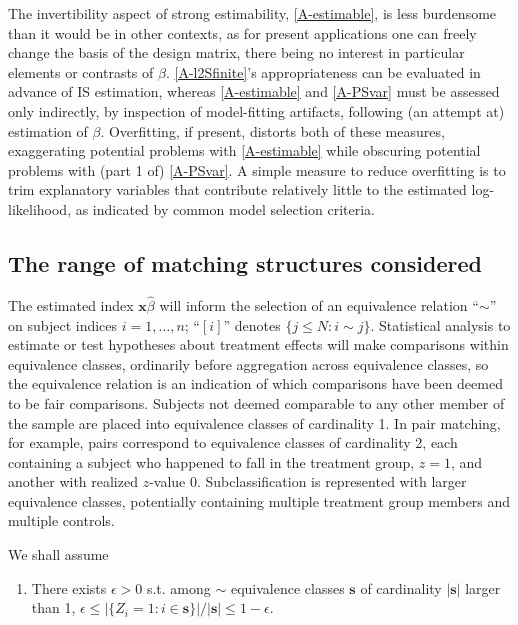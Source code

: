 \documentclass{article}
\newcounter{saveenumi}
\newcommand{\conti}{\setcounter{enumi}{\value{saveenumi}}}
\theoremstyle{remark}
\begin{document}
The invertibility aspect of strong estimability, \ref{A-estimable}, is less burdensome than it would be in other contexts, as for present applications one can freely change the basis of the design matrix, there being no interest in particular elements or contrasts of $\beta$.   
\ref{A-l2Sfinite}'s appropriateness can be evaluated in advance of IS estimation, whereas \ref{A-estimable} and \ref{A-PSvar} must be assessed only indirectly, by inspection of model-fitting artifacts, following (an attempt at) estimation of $\beta$.
Overfitting, if present, distorts both of these measures, exaggerating potential problems with \ref{A-estimable} while obscuring potential problems with (part 1 of) \ref{A-PSvar}.  A simple measure to reduce overfitting is to trim explanatory variables that contribute relatively little to the estimated log-likelihood, as indicated by common model selection criteria.

\subsection{The range of matching structures considered}

The estimated index $\mathbf{x}\hat\beta$ will inform the selection of an equivalence relation ``$\sim$'' on subject indices $i = 1, \ldots, n$; ``$[i]$'' denotes $\{j\leq N: i \sim j\}$. Statistical analysis to estimate or test hypotheses about treatment effects will make comparisons within equivalence classes, ordinarily before aggregation across equivalence classes, so the equivalence relation is an indication of which comparisons have been deemed to be fair comparisons.  Subjects not deemed comparable to any other member of the sample are placed into equivalence classes of cardinality 1.  In pair matching, for example, pairs correspond to equivalence classes of cardinality 2, each containing a subject who happened to fall in the treatment group, $z=1$, and another with realized  $z$-value 0. Subclassification is represented with larger equivalence classes, potentially containing multiple treatment group members and multiple controls. 

We shall assume
\begin{enumerate} \conti
\item \label{A-bddedmatchratio} There exists $\epsilon>0$ s.t. among $\sim$ equivalence classes $\mathbf{s}$ of cardinality $|\mathbf{s}|$ larger than 1, $\epsilon \leq | \{Z_i=1: i\in \mathbf{s} \}|/|\mathbf{s}| \leq 1-\epsilon$. 
\end{enumerate}
\end{document}
